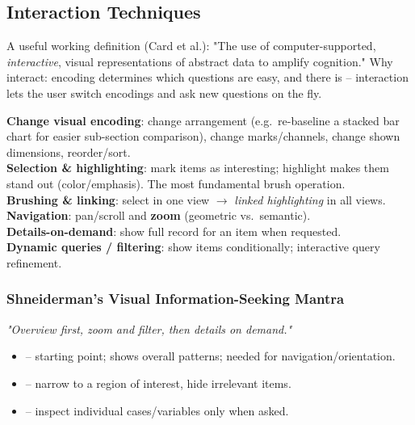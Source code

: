 \subsection{Interaction Techniques}

A useful working definition (Card et al.): "The use of computer-supported, \emph{interactive}, visual representations of abstract data to amplify cognition." Why interact: encoding determines which questions are easy, and there is  -- interaction lets the user switch encodings and ask new questions on the fly.

\begin{keybox}
\textbf{Change visual encoding}: change arrangement (e.g.\ re-baseline a stacked bar chart for easier sub-section comparison), change marks/channels, change shown dimensions, reorder/sort. \\
\textbf{Selection \& highlighting}: mark items as interesting; highlight makes them stand out (color/emphasis). The most fundamental brush operation. \\
\textbf{Brushing \& linking}: select in one view $\rightarrow$ \emph{linked highlighting} in all views. \\
\textbf{Navigation}: pan/scroll and \textbf{zoom} (geometric vs.\ semantic). \\
\textbf{Details-on-demand}: show full record for an item when requested. \\
\textbf{Dynamic queries / filtering}: show items conditionally; interactive query refinement.
\end{keybox}

\subsubsection{Shneiderman's Visual Information-Seeking Mantra}
\begin{algobox}[Shneiderman 1996]
\begin{center}\itshape\large "Overview first, zoom and filter, then details on demand."\end{center}
\begin{itemize}
  \item {} -- starting point; shows overall patterns; needed for navigation/orientation.
  \item {} -- narrow to a region of interest, hide irrelevant items.
  \item {} -- inspect individual cases/variables only when asked.
\end{itemize}
\end{algobox}

